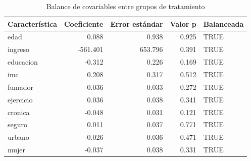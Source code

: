 
\begin{longtable}[t]{lrrrl}
\caption{Balance de covariables entre grupos de tratamiento}\\
\toprule
Característica & Coeficiente & Error estándar & Valor p & Balanceada\\
\midrule
edad & 0.088 & 0.938 & 0.925 & TRUE\\
ingreso & -561.401 & 653.796 & 0.391 & TRUE\\
educacion & -0.312 & 0.226 & 0.169 & TRUE\\
imc & 0.208 & 0.317 & 0.512 & TRUE\\
fumador & 0.036 & 0.033 & 0.272 & TRUE\\
ejercicio & 0.036 & 0.038 & 0.341 & TRUE\\
cronica & -0.048 & 0.031 & 0.121 & TRUE\\
seguro & 0.011 & 0.037 & 0.771 & TRUE\\
urbano & -0.026 & 0.036 & 0.471 & TRUE\\
mujer & -0.037 & 0.038 & 0.331 & TRUE\\
\bottomrule
\end{longtable}
